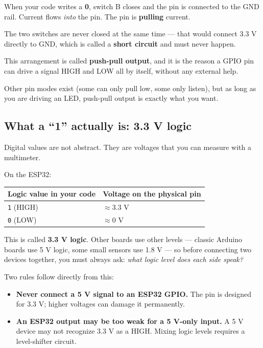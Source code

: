 \documentclass[11pt]{article}
\begin{document}
When your code writes a \textbf{0}, switch B closes and the pin is connected to the GND rail. Current flows \emph{into} the pin. The pin is \textbf{pulling} current.

The two switches are never closed at the same time --- that would connect 3.3 V directly to GND, which is called a \textbf{short circuit} and must never happen.

This arrangement is called \textbf{push-pull output}, and it is the reason a GPIO pin can drive a signal HIGH and LOW all by itself, without any external help.

Other pin modes exist (some can only pull low, some only listen), but as long as you are driving an LED, push-pull output is exactly what you want.

\subsection{What a ``1'' actually is: 3.3 V logic}

Digital values are not abstract. They are voltages that you can measure with a multimeter.

On the ESP32:

\begin{table}[htbp]
\centering
\renewcommand{\arraystretch}{1.3}
\begin{tabularx}{\textwidth}{@{}X X@{}}
\toprule
\textbf{Logic value in your code} & \textbf{Voltage on the physical pin} \\
\midrule
\texttt{1} (HIGH) & $\approx 3.3$ V \\
\texttt{0} (LOW) & $\approx 0$ V \\
\bottomrule
\end{tabularx}
\end{table}

This is called \textbf{3.3 V logic}. Other boards use other levels --- classic Arduino boards use 5 V logic, some small sensors use 1.8 V --- so before connecting two devices together, you must always ask: \emph{what logic level does each side speak?}

Two rules follow directly from this:

\begin{itemize}
    \item \textbf{Never connect a 5 V signal to an ESP32 GPIO.} The pin is designed for 3.3 V; higher voltages can damage it permanently.
    
    \item \textbf{An ESP32 output may be too weak for a 5 V-only input.} A 5 V device may not recognize 3.3 V as a HIGH. Mixing logic levels requires a level-shifter circuit.
\end{itemize}
\end{document}
